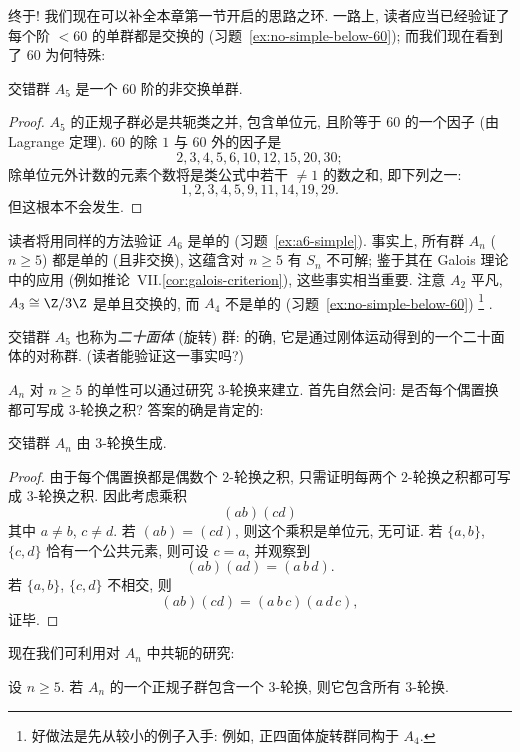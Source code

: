 终于! 我们现在可以补全本章第一节开启的思路之环. 一路上, 读者应当已经验证了每个阶 $< 60$ 的单群都是交换的 (习题~\ref{ex:no-simple-below-60}); 而我们现在看到了 $60$ 为何特殊:

\begin{corollary}
\label{cor:a5-simple}
交错群 $A_5$ 是一个 $60$ 阶的非交换单群.
\end{corollary}

\begin{proof}
$A_5$ 的正规子群必是共轭类之并, 包含单位元, 且阶等于 $60$ 的一个因子 (由 Lagrange 定理). $60$ 的除 $1$ 与 $60$ 外的因子是
\[
2, 3, 4, 5, 6, 10, 12, 15, 20, 30;
\]
除单位元外计数的元素个数将是类公式中若干 $\neq 1$ 的数之和, 即下列之一:
\[
1, 2, 3, 4, 5, 9, 11, 14, 19, 29.
\]
但这根本不会发生.
\end{proof}

读者将用同样的方法验证 $A_6$ 是单的 (习题~\ref{ex:a6-simple}). 事实上, 所有群 $A_n$ ($n \geq 5$) 都是单的 (且非交换), 这蕴含对 $n \geq 5$ 有 $S_n$ 不可解; 鉴于其在 Galois 理论中的应用 (例如推论~VII.\ref{cor:galois-criterion}), 这些事实相当重要. 注意 $A_2$ 平凡, $A_3 \cong \Z/3\Z$ 是单且交换的, 而 $A_4$ 不是单的 (习题~\ref{ex:no-simple-below-60})%
\footnote{好做法是先从较小的例子入手: 例如, 正四面体旋转群同构于 $A_4$.}%
.

交错群 $A_5$ 也称为\emph{二十面体} (旋转) 群: 的确, 它是通过刚体运动得到的一个二十面体的对称群. (读者能验证这一事实吗?)

$A_n$ 对 $n \geq 5$ 的单性可以通过研究 $3$-轮换来建立. 首先自然会问: 是否每个偶置换都可写成 $3$-轮换之积? 答案的确是肯定的:

\begin{lemma}
\label{lem:an-3cycles}
交错群 $A_n$ 由 $3$-轮换生成.
\end{lemma}

\begin{proof}
由于每个偶置换都是偶数个 $2$-轮换之积, 只需证明每两个 $2$-轮换之积都可写成 $3$-轮换之积. 因此考虑乘积
\[
(ab)(cd)
\]
其中 $a \neq b$, $c \neq d$. 若 $(ab) = (cd)$, 则这个乘积是单位元, 无可证. 若 $\{a,b\}$, $\{c,d\}$ 恰有一个公共元素, 则可设 $c = a$, 并观察到
\[
(ab)(ad) = (a\, b\, d).
\]
若 $\{a,b\}$, $\{c,d\}$ 不相交, 则
\[
(ab)(cd) = (a\, b\, c)(a\, d\, c),
\]
证毕.
\end{proof}

现在我们可利用对 $A_n$ 中共轭的研究:

\begin{claim}
\label{claim:an-normal-3cycle}
设 $n \geq 5$. 若 $A_n$ 的一个正规子群包含一个 $3$-轮换, 则它包含所有 $3$-轮换.
\end{claim}

